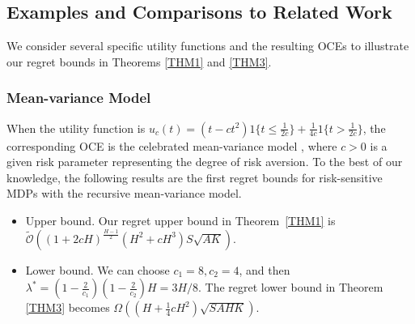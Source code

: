 \documentclass[11pt]{article}
\newcommand{\1}{\mathbbm{1}}
\begin{document}
\subsection{Examples and Comparisons to Related Work}\label{SECEX}
We consider several specific utility functions and the resulting OCEs to illustrate our regret bounds in Theorems \ref{THM1} and \ref{THM3}. 


\subsubsection{Mean-variance Model}
When the utility function is $u_c(t)=(t-ct^2)1\{t\leq \frac{1}{2c}\}+\frac{1}{4c}1\{t> \frac{1}{2c}\}$, the corresponding OCE is the celebrated mean-variance model \cite{markowitz1952}, where $c>0$ is a given risk parameter representing the degree of risk aversion. To the best of our knowledge, the following results are the first regret bounds for risk-sensitive MDPs with the recursive mean-variance model.


\begin{itemize}
 \item Upper bound. Our regret upper bound in Theorem~\ref{THM1} is $\tilde{\mathcal{O}}\left((1+2cH)^{\frac{H-1}{2}}(H^2+cH^3)S\sqrt{AK}\right)$.

\item Lower bound. We can choose $c_1=8,c_2=4$, and then $\lambda^*=\left(1-\frac{2}{c_1}\right)\left(1-\frac{2}{c_2}\right)H = 3H/8$. The regret lower bound in Theorem \ref{THM3} becomes $\Omega\left((H+\frac{1}{4}cH^2)\sqrt{SAHK}\right)$. 
\end{itemize}
\end{document}

